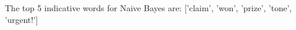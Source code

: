 \begin{answer}
\\ \\
The top 5 indicative words for Naive Bayes are:  ['claim', 'won', 'prize', 'tone', 'urgent!']
\\ \\
\end{answer}
